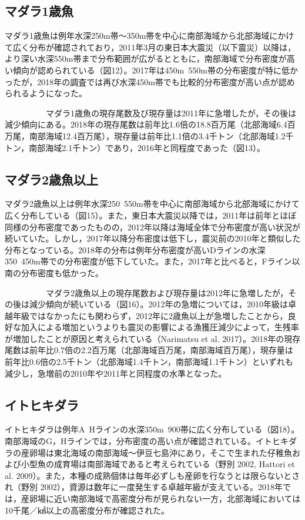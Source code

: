 \documentclass[11pt]{article} %
\begin{document}
\begin{linenumbers}
\subsection{マダラ1歳魚}
マダラ1歳魚は例年水深250m帯～350m帯を中心に南部海域から北部海域にかけて広く分布が確認されており，2011年3月の東日本大震災（以下震災）以降は，より深い水深550m帯まで分布範囲が広がるとともに，南部海域で分布密度が高い傾向が認められている（図12）。2017年は450m~550m帯の分布密度が特に低かったが，2018年の調査では再び水深450m帯でも比較的分布密度が高い点が認められるようになった。

\ \ \ \ \ \ \ \ \ \ 
マダラ1歳魚の現存尾数及び現存量は2011年に急増したが，その後は減少傾向にある。2018年の現存尾数は前年比1.6倍の18.8百万尾（北部海域6.4百万尾，南部海域12.4百万尾），現存量は前年比1.1倍の3.4千トン（北部海域1.2千トン，南部海域2.1千トン）であり，2016年と同程度であった（図13）。

\subsection{マダラ2歳魚以上}
マダラ2歳魚以上は例年水深250~550m帯を中心に南部海域から北部海域にかけて広く分布している（図15）。また，東日本大震災以降では，2011年は前年とほぼ同様の分布密度であったものの，2012年以降は海域全体で分布密度が高い状況が続いていた。しかし，2017年以降分布密度は低下し，震災前の2010年と類似した分布となっている。2018年の分布は例年分布密度が高いDラインの水深350~450m帯での分布密度が低下していた。また，2017年と比べると，Fライン以南の分布密度も低かった。

\ \ \ \ \ \ \ \ \ \ 
マダラ2歳魚以上の現存尾数および現存量は2012年に急増したが，その後は減少傾向が続いている（図16）。2012年の急増については，2010年級は卓越年級ではなかったにも関わらず，2012年に2歳魚以上が急増したことから，良好な加入による増加というよりも震災の影響による漁獲圧減少によって，生残率が増加したことが原因と考えられている（Narimatsu et al. 2017）。2018年の現存尾数は前年比0.7倍の2.2百万尾（北部海域百万尾，南部海域百万尾），現存量は前年比0.6倍の2.5千トン（北部海域1.4千トン，南部海域1.1千トン）といずれも減少し，急増前の2010年や2011年と同程度の水準となった。

\subsection{イトヒキダラ}
イトヒキダラは例年A~Hラインの水深350m~900帯に広く分布している（図18）。南部海域のG，Hラインでは，分布密度の高い点が確認されている。イトヒキダラの産卵場は東北海域の南部海域～伊豆七島沖にあり，そこで生まれた仔稚魚および小型魚の成育場は南部海域であると考えられている（野別 2002, Hattori et al. 2009）。また，本種の成熟個体は毎年必ずしも産卵を行なうとは限らないとされ（野別 2002），資源は数年に一度発生する卓越年級が支えている。2018年では，産卵場に近い南部海域で高密度分布が見られない一方，北部海域においては10千尾／㎢以上の高密度分布が確認された。


\end{linenumbers}
\end{document}
